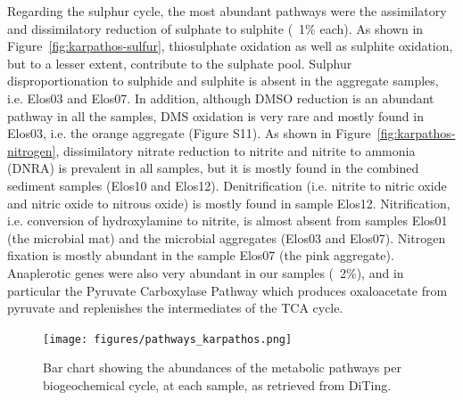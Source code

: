    Regarding the sulphur cycle, the most abundant pathways were the assimilatory and dissimilatory reduction of sulphate to sulphite (~1\% each). 
   As shown in Figure~\ref{fig:karpathos-sulfur}, thiosulphate oxidation as well as sulphite oxidation, but to a lesser extent, contribute to the sulphate pool. 
   Sulphur disproportionation to sulphide and sulphite is absent in the aggregate samples, i.e. Elos03 and Elos07. In addition, although DMSO reduction is 
   an abundant pathway in all the samples, DMS oxidation is very rare and mostly found in Elos03, i.e. the orange aggregate (Figure S11).
   As shown in Figure~\ref{fig:karpathos-nitrogen}, dissimilatory nitrate reduction to nitrite and nitrite to ammonia (DNRA) is prevalent in all samples, 
   but it is mostly found in the combined sediment samples (Elos10 and Elos12). 
   Denitrification (i.e. nitrite to nitric oxide and nitric oxide to nitrous oxide) is mostly found in sample Elos12. Nitrification, i.e. conversion of 
   hydroxylamine to nitrite, is almost absent from samples Elos01 (the microbial mat) and the microbial aggregates (Elos03 and Elos07). 
   Nitrogen fixation is mostly abundant in the sample Elos07 (the pink aggregate). 
   Anaplerotic genes were also very abundant in our samples (~2\%), and in particular the Pyruvate Carboxylase Pathway which produces oxaloacetate from pyruvate and replenishes the intermediates of the TCA cycle. 


   \begin{figure}[h]
      \centering
      \texttt{[image: figures/pathways\_karpathos.png]}
      \caption[Abundances of the metabolic pathways per biogeochemical cycle, at each sample]{
         Bar chart showing the abundances of the metabolic pathways per biogeochemical cycle, at each sample, as retrieved from DiTing. 
      }
      \label{fig:pathway-abundances}
   \end{figure}   




